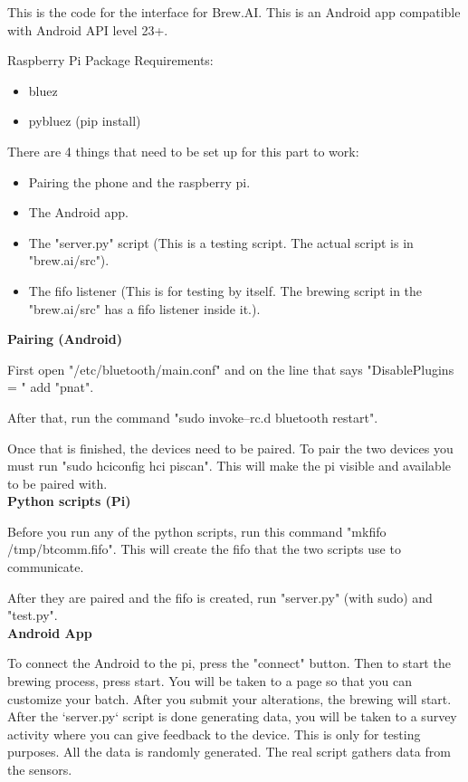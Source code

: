 This is the code for the interface for Brew.AI. This is an Android app compatible with Android API level 23+.


Raspberry Pi Package Requirements:

\begin{itemize}
\item bluez
\item pybluez (pip install)
\end{itemize}

There are 4 things that need to be set up for this part to work:

\begin{itemize}
\item Pairing the phone and the raspberry pi.
\item The Android app.
\item The "server.py" script (This is a testing script. The actual script is in "brew.ai/src").
\item The fifo listener (This is for testing by itself. The brewing script in the "brew.ai/src" has a fifo listener inside it.).
\end{itemize}

\textbf{Pairing (Android)}

First open "/etc/bluetooth/main.conf" and on the line that says "DisablePlugins = " add "pnat".

After that, run the command "sudo invoke–rc.d bluetooth restart".

Once that is finished, the devices need to be paired. To pair the two devices you must run "sudo hciconfig hci piscan". This will make the pi visible and available to be paired with. \\

\textbf{Python scripts (Pi)}

Before you run any of the python scripts, run this command "mkfifo /tmp/btcomm.fifo". This will create the fifo that the two scripts use to communicate.

After they are paired and the fifo is created, run "server.py" (with sudo) and "test.py".\\

\textbf{Android App}

To connect the Android to the pi, press the "connect" button. Then to start the brewing process, press start.
You will be taken to a page so that you can customize your batch. After you submit your alterations, the brewing will start.
After the `server.py` script is done generating data, you will be taken to a survey activity where you can give feedback to the device.
This is only for testing purposes. All the data is randomly generated. The real script gathers data from the sensors.\\

